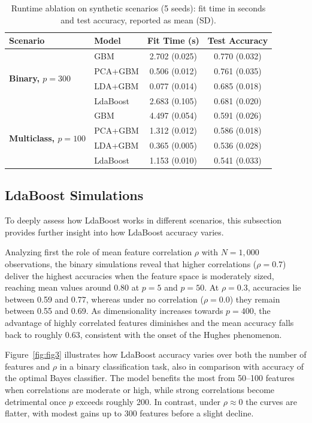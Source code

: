 \documentclass[11pt,a4paper]{article}
\begin{document}
\begin{table}[h!]
\centering
\begingroup
\setlength{\tabcolsep}{4.5pt}
\renewcommand{\arraystretch}{1.0}
\footnotesize
\caption{Runtime ablation on synthetic scenarios (5 seeds): fit time in seconds and test accuracy, reported as mean (SD).}
\label{tab:runtime_ablation}
\begin{tabular}{@{}llcc@{}}
\toprule
\textbf{Scenario} & \textbf{Model} & \textbf{Fit Time (s)} & \textbf{Test Accuracy} \\
\midrule
\multirow{4}{*}{\textbf{Binary, $p=300$}}
    & GBM      & 2.702 (0.025) & 0.770 (0.032) \\
    & PCA+GBM  & 0.506 (0.012) & 0.761 (0.035) \\
    & LDA+GBM  & 0.077 (0.014) & 0.685 (0.018) \\
    & LdaBoost & 2.683 (0.105) & 0.681 (0.020) \\
\midrule
\multirow{4}{*}{\textbf{Multiclass, $p=100$}}
    & GBM      & 4.497 (0.054) & 0.591 (0.026) \\
    & PCA+GBM  & 1.312 (0.012) & 0.586 (0.018) \\
    & LDA+GBM  & 0.365 (0.005) & 0.536 (0.028) \\
    & LdaBoost & 1.153 (0.010) & 0.541 (0.033) \\
\bottomrule
\end{tabular}
\endgroup
\end{table}

\subsection*{LdaBoost Simulations}
To deeply assess how LdaBoost works in different scenarios, this subsection provides further insight into how LdaBoost accuracy varies.

Analyzing first the role of mean feature correlation $\rho$ with $N=1{,}000$ observations, the binary simulations reveal that higher correlations ($\rho = 0.7$) deliver the highest accuracies when the feature space is moderately sized, reaching mean values around 0.80 at $p = 5$ and $p = 50$. At $\rho = 0.3$, accuracies lie between 0.59 and 0.77, whereas under no correlation ($\rho = 0.0$) they remain between 0.55 and 0.69. As dimensionality increases towards $p = 400$, the advantage of highly correlated features diminishes and the mean accuracy falls back to roughly 0.63, consistent with the onset of the Hughes phenomenon.

Figure~\ref{fig:fig3} illustrates how LdaBoost accuracy varies over both the number of features and $\rho$ in a binary classification task, also in comparison with accuracy of the optimal Bayes classifier. The model benefits the most from 50--100 features when correlations are moderate or high, while strong correlations become detrimental once $p$ exceeds roughly 200. In contrast, under $\rho \approx 0$ the curves are flatter, with modest gains up to 300 features before a slight decline.
\end{document}
